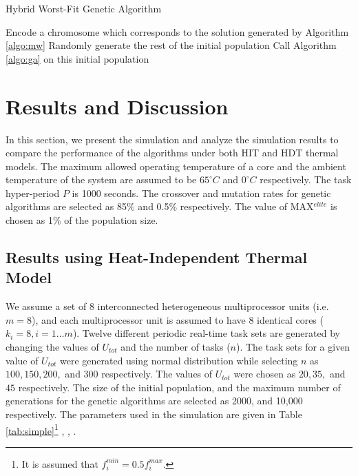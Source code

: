 \documentclass[conference]{IEEEtran}
\begin{document}
\begin{algorithm} 
\caption{Hybrid Worst-Fit Genetic Algorithm} \label{algo:hywga}
\footnotesize
\begin{algorithmic}[1] 
\STATE Encode a chromosome which corresponds to the solution generated by Algorithm \ref{algo:mw}
\STATE Randomly generate the rest of the initial population
\STATE Call Algorithm \ref{algo:ga} on this initial population
\end{algorithmic}
\end{algorithm}
\vspace{-0.2in}


\section{Results and Discussion}

In this section, we present the simulation and analyze the simulation results
to compare the performance of the algorithms under both HIT and HDT thermal models. 
The maximum allowed operating temperature of a core and the ambient temperature of the system are assumed to
be  $65^\circ C$ and $0^\circ C$ respectively. The task hyper-period $P$ is 1000 seconds. 
The crossover and mutation rates for genetic algorithms are selected as 85\% and 0.5\% respectively. The value of 
MAX$^{elite}$ is chosen as 1\% of the population size. 

\subsection{Results using Heat-Independent  Thermal Model}

We assume a set of $8$ interconnected heterogeneous multiprocessor units (i.e. $m=8$), and each multiprocessor unit  is 
assumed to have $8$ identical cores ($k_i=8, i=1 \ldots m$). 
Twelve different periodic real-time task sets are generated by changing the values of $U_{tot}$ and the number of tasks ($n$).
The task sets for a given value of $U_{tot}$ were generated using normal distribution while selecting $n$ as $100, 150, 200,$ and $300$ respectively.
The values of $U_{tot}$ were chosen as  $20, 35,$ and $45$ respectively.
The size of the initial population, and the maximum number of generations for the genetic algorithms are selected as 2000, and 10,000 respectively.
The parameters used in the simulation are  given in Table \ref{tab:simple}\footnote{It is assumed that $f_i^{min} = 0.5f_i^{max}$.} \cite{Quan10}, \cite{Leping10}, \cite{Chaturvedi10}.
\end{document}
